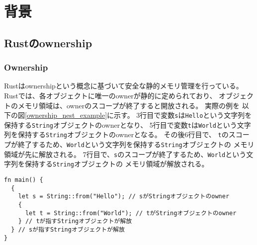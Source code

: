 \documentclass{sumiilab-paper}
\theoremstyle{mystyle}
\numberwithin{definition}{chapter} %
\begin{document}

\chapter{背景}

\section{Rustのownership}

\subsection{Ownership}
Rustはownershipという概念に基づいて安全な静的メモリ管理を行っている。
Rustでは、各オブジェクトに唯一のownerが静的に定められており、
オブジェクトのメモリ領域は、ownerのスコープが終了すると開放される。
実際の例を
以下の図\ref{ownership_nest_example}に示す。
3行目で変数\texttt{s}は\texttt{Hello}という文字列を保持する\texttt{String}オブジェクトのownerとなり、
5行目で変数\texttt{t}は\texttt{World}という文字列を保持する\texttt{String}オブジェクトのownerとなる。
その後6行目で、
\texttt{t}のスコープが終了するため、\texttt{World}という文字列を保持する\texttt{String}オブジェクトの
メモリ領域が先に解放される。
7行目で、\texttt{s}のスコープが終了するため、\texttt{World}という文字列を保持する\texttt{String}オブジェクトの
メモリ領域が解放される。
\begin{lstlisting}[caption=Ownershipによるメモリ管理,label=ownership_nest_example, captionpos=b]
fn main() {
  {
    let s = String::from("Hello"); // sがStringオブジェクトのowner
    {
      let t = String::from("World"); // tがStringオブジェクトのowner
    } // tが指すStringオブジェクトが解放
  } // sが指すStringオブジェクトが解放
}
\end{lstlisting}
\end{document}
